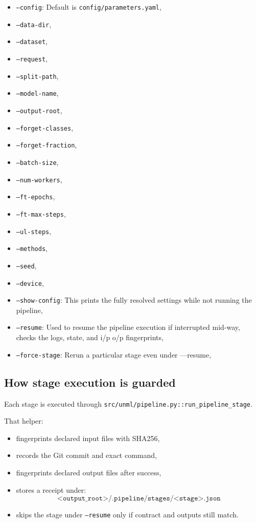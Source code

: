 \documentclass[10pt,a4paper]{article}
\begin{document}
\begin{itemize}
  \item \texttt{---config}: Default is \texttt{config/parameters.yaml},
  \item \texttt{---data-dir},
  \item \texttt{---dataset},
  \item \texttt{---request},
  \item \texttt{---split-path},
  \item \texttt{---model-name},
  \item \texttt{---output-root},
  \item \texttt{---forget-classes},
  \item \texttt{---forget-fraction},
  \item \texttt{---batch-size},
  \item \texttt{---num-workers},
  \item \texttt{---ft-epochs},
  \item \texttt{---ft-max-steps},
  \item \texttt{---ul-steps},
  \item \texttt{---methods},
  \item \texttt{---seed},
  \item \texttt{---device},
  \item \texttt{---show-config}: This prints the fully resolved settings while not running the pipeline,
  \item \texttt{---resume}: Used to resume the pipeline execution if interrupted mid-way, checks the logs, state, and i/p o/p fingerprints,
  \item \texttt{---force-stage}: Rerun a particular stage even under ---resume,
\end{itemize}

\subsection{How stage execution is guarded}
Each stage is executed through \texttt{src/unml/pipeline.py::run\_pipeline\_stage}.

That helper:
\begin{itemize}
  \item fingerprints declared input files with SHA256,
  \item records the Git commit and exact command,
  \item fingerprints declared output files after success,
  \item stores a receipt under:
  \[
  \texttt{<output\_root>/.pipeline/stages/<stage>.json}
  \]
  \item skips the stage under \texttt{--resume} only if contract and outputs still match.
\end{itemize}
\end{document}
